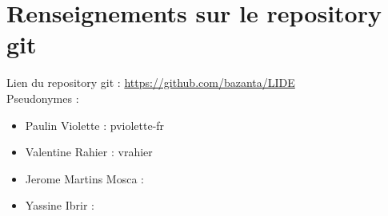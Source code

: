 \chapter{Renseignements sur le repository git}

Lien du repository git :  \url{https://github.com/bazanta/LIDE}
\\Pseudonymes :
\begin{itemize}

	\item Paulin Violette : pviolette-fr
	\item Valentine Rahier : vrahier
	\item Jerome Martins Mosca :
	\item Yassine Ibrir :

\end{itemize}
